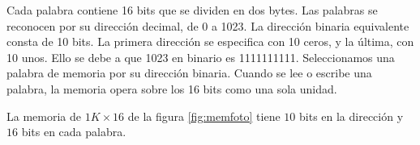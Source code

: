 Cada palabra contiene 16 bits que se
dividen en dos bytes. Las palabras se reconocen por su dirección decimal, de 0 a 1023. La dirección binaria equivalente consta de 10 bits. La primera dirección se especifica con 10 ceros, y la última, con 10 unos. Ello se debe a que 1023 en binario es 1111111111. Seleccionamos una palabra de memoria por su dirección binaria. Cuando se lee o escribe una palabra, la memoria opera sobre los 16 bits como una sola unidad.

\begin{mdframed}[backgroundcolor=gray!10,linewidth=0]
    La memoria de $1K \times 16$ de la figura \ref{fig:memfoto} tiene $10$ bits en la dirección y $16$ bits en cada palabra.
\end{mdframed}